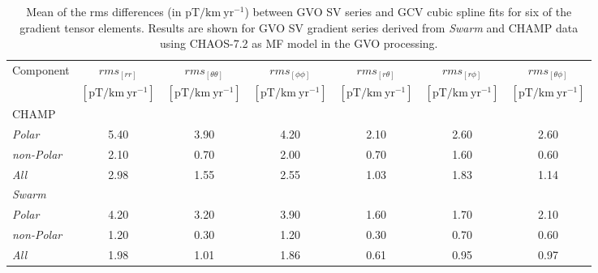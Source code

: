 \documentclass[extra,mreferee]{gji}
\begin{document}
\begin{table}
\caption{Mean of the rms differences (in $\mathrm{pT/km \: yr^{-1}}$) between GVO SV series and GCV cubic spline fits for six of the gradient tensor elements. Results are shown for GVO SV gradient series derived from \textit{Swarm} and CHAMP data using CHAOS-7.2 \citep{Finlay_etal_2020} as MF model in the GVO processing.}
\centering
{\small
\begin{tabular}{l | c c c c c c}
\hline
 Component          & $rms_{[rr]}$& $rms_{[\theta \theta]}$& $rms_{[\phi \phi]}$& $rms_{[r \theta]}$& $rms_{[r \phi]}$& $rms_{[\theta \phi]}$  \\
                    & $[\mathrm{pT}/\mathrm{km} \: \mathrm{yr}^{-1}]$& $[\mathrm{pT}/\mathrm{km} \: \mathrm{yr}^{-1}]$  & $[\mathrm{pT}/\mathrm{km} \: \mathrm{yr}^{-1}]$ & $[\mathrm{pT}/\mathrm{km} \: \mathrm{yr}^{-1}]$ & $[\mathrm{pT}/\mathrm{km} \: \mathrm{yr}^{-1}]$ & $[\mathrm{pT}/\mathrm{km} \: \mathrm{yr}^{-1}]$    \\
\hline                             
CHAMP               &          &          &          &          &          &         \\ 
\textit{Polar}      &     5.40 &     3.90 &     4.20 &     2.10 &     2.60 &     2.60 \\ 
\textit{non-Polar}  &     2.10 &     0.70 &     2.00 &     0.70 &     1.60 &     0.60 \\ 
\textit{All}        &     2.98 &     1.55 &     2.55 &     1.03 &     1.83 &     1.14 \\  
\hline          
\textit{Swarm}      &          &          &          &          &          &         \\ 
\textit{Polar}      &     4.20 &     3.20 &     3.90 &     1.60 &     1.70 &     2.10 \\ 
\textit{non-Polar}  &     1.20 &     0.30 &     1.20 &     0.30 &     0.70 &     0.60 \\ 
\textit{All}        &     1.98 &     1.01 &     1.86 &     0.61 &     0.95 &     0.97 \\ 
\hline   
\end{tabular}
\label{table:1a}}
\end{table} 
\end{document}
